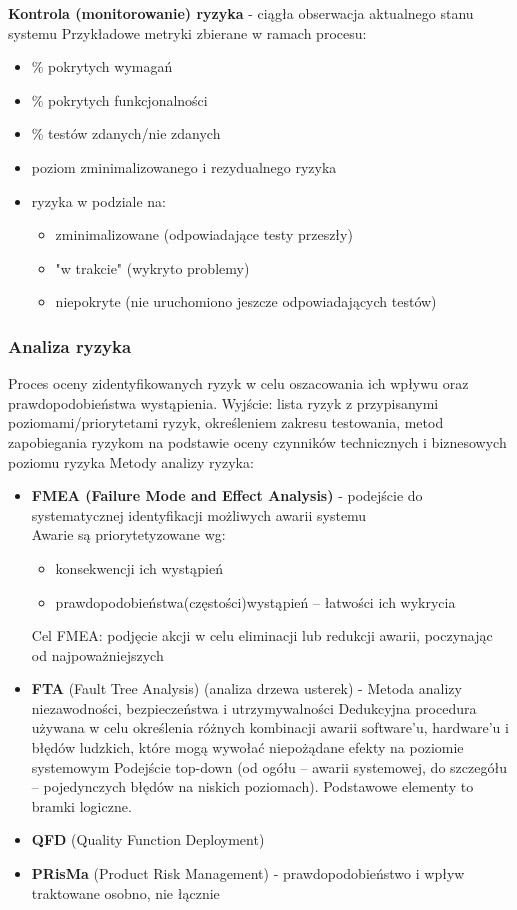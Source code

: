 \documentclass[../main.tex]{subfiles}
\begin{document}
    \textbf{Kontrola (monitorowanie) ryzyka} - ciągła obserwacja aktualnego stanu systemu Przykładowe metryki zbierane w ramach procesu:
    \begin{itemize}
        \item \% pokrytych wymagań
        \item \% pokrytych funkcjonalności
        \item \% testów zdanych/nie zdanych
        \item poziom zminimalizowanego i rezydualnego ryzyka
        \item ryzyka w podziale na:
        \begin{itemize}
            \item zminimalizowane (odpowiadające testy przeszły)
            \item "w trakcie" (wykryto problemy)
            \item niepokryte (nie uruchomiono jeszcze odpowiadających testów)
        \end{itemize}
    \end{itemize}


    \subsubsection{Analiza ryzyka}
    Proces oceny zidentyfikowanych ryzyk w celu oszacowania ich wpływu
    oraz prawdopodobieństwa wystąpienia. Wyjście: lista ryzyk z przypisanymi poziomami/priorytetami ryzyk, określeniem zakresu testowania, metod zapobiegania ryzykom na podstawie oceny czynników technicznych i biznesowych poziomu ryzyka
    Metody analizy ryzyka:
    \begin{itemize}
        \item \textbf{FMEA (Failure Mode and Effect Analysis)} - podejście do systematycznej identyfikacji możliwych awarii systemu\\
        Awarie są priorytetyzowane wg:
        \begin{itemize}
            \item konsekwencji ich wystąpień
            \item prawdopodobieństwa(częstości)wystąpień – łatwości ich wykrycia
        \end{itemize}
        Cel FMEA: podjęcie akcji w celu eliminacji lub redukcji awarii, poczynając od najpoważniejszych
        \item \textbf{FTA} (Fault Tree Analysis) (analiza drzewa usterek) - Metoda analizy niezawodności, bezpieczeństwa i utrzymywalności
        Dedukcyjna procedura używana w celu określenia różnych kombinacji awarii software’u, hardware’u i błędów ludzkich, które mogą wywołać niepożądane efekty na poziomie systemowym
        Podejście top-down (od ogółu – awarii systemowej, do szczegółu – pojedynczych błędów na niskich poziomach). Podstawowe elementy to bramki logiczne.
        \item \textbf{QFD} (Quality Function Deployment)
        \item \textbf{PRisMa} (Product Risk Management) - prawdopodobieństwo i wpływ traktowane osobno, nie łącznie
    \end{itemize}
\end{document}
